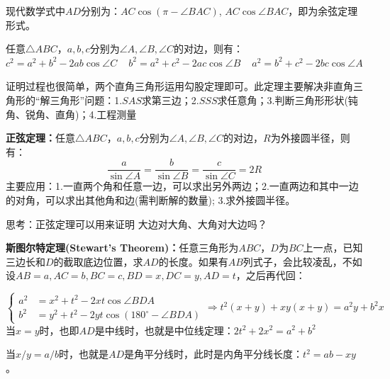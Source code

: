 \documentclass[../main.tex]{subfiles}
\begin{document}
现代数学式中$AD$分别为：$AC\cos(\pi - \angle BAC)$, $AC\cos\angle BAC$，即为余弦定理形式。

任意$\triangle ABC$，$a,b,c$分别为$\angle A, \angle B, \angle C$的对边，则有：\\
$c^2=a^2+b^2-2ab\cos \angle C \phantom{xx} b^2=a^2+c^2-2ac\cos \angle B \phantom{xx} a^2=b^2+c^2-2bc\cos \angle A $

证明过程也很简单，两个直角三角形运用勾股定理即可。此定理主要解决非直角三角形的“解三角形”问题：1.$SAS$求第三边；2.$SSS$求任意角；3.判断三角形形状(钝角、锐角、直角)；4.工程测量

\textbf{正弦定理：}任意$\triangle ABC$，$a,b,c$分别为$\angle A, \angle B, \angle C$的对边，$R$为外接圆半径，则有：
$$\frac{a}{\sin \angle A} = \frac{b}{\sin \angle B} = \frac{c}{\sin \angle C}=2R $$
主要应用：1.一直两个角和任意一边，可以求出另外两边；2.一直两边和其中一边的对角，可以求出其他角和边(需判断解的数量); 3.求外接圆半径。

思考：正弦定理可以用来证明 大边对大角、大角对大边吗？

\begin{minipage}{0.7\textwidth}
  \textbf{斯图尔特定理(Stewart's Theorem)：}任意三角形为$ABC$，$D$为$BC$上一点，已知三边长和$D$的截取底边位置，求$AD$的长度。如果有$AB$列式子，会比较凌乱，不如设$AB=a, AC=b, BC=c, BD=x, DC=y, AD=t$，之后再代回：
\end{minipage}
\begin{minipage}{0.3\textwidth}
  \centering
\end{minipage}
\[
  \left\{
    \begin{aligned}
      a^2&=x^2+t^2-2xt\cos\angle BDA\\
      b^2&=y^2+t^2-2yt\cos(180^{\circ}-\angle BDA)
    \end{aligned}
  \right.
  \Rightarrow
    t^2(x+y)+xy(x+y)=a^2y+b^2x
\]
当$x=y$时，也即$AD$是中线时，也就是中位线定理：$2t^2+2x^2=a^2+b^2$

当$x/y=a/b$时，也就是$AD$是角平分线时，此时是内角平分线长度：$t^2=ab-xy$。
\end{document}
